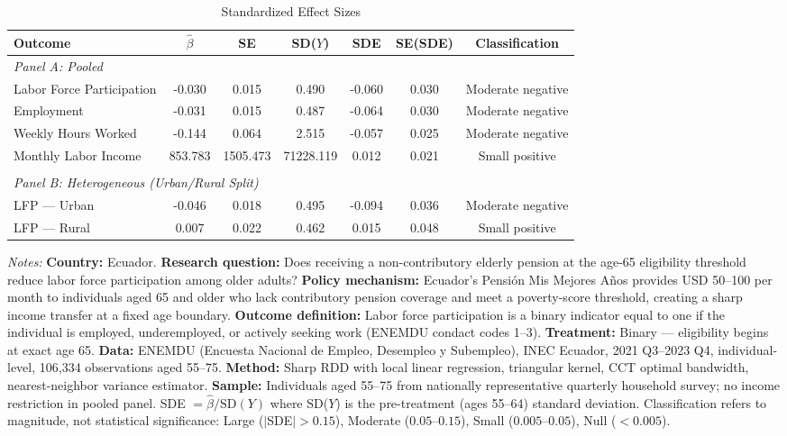 \begin{table}[t]
\centering
\begin{threeparttable}
\caption{Standardized Effect Sizes}
\label{tab:sde}
\begin{adjustbox}{max width=\textwidth}
\begin{tabular}{lcccccc}
\hline\hline
  Outcome & $\hat{\beta}$ & SE & SD($Y$) & SDE & SE(SDE) & Classification \\
\hline
  \multicolumn{7}{l}{\textit{Panel A: Pooled}} \\
  Labor Force Participation & -0.030 & 0.015 & 0.490 & -0.060 & 0.030 & Moderate negative \\
  Employment & -0.031 & 0.015 & 0.487 & -0.064 & 0.030 & Moderate negative \\
  Weekly Hours Worked & -0.144 & 0.064 & 2.515 & -0.057 & 0.025 & Moderate negative \\
  Monthly Labor Income & 853.783 & 1505.473 & 71228.119 & 0.012 & 0.021 & Small positive \\
  \\
  \multicolumn{7}{l}{\textit{Panel B: Heterogeneous (Urban/Rural Split)}} \\
  LFP --- Urban & -0.046 & 0.018 & 0.495 & -0.094 & 0.036 & Moderate negative \\
  LFP --- Rural & 0.007 & 0.022 & 0.462 & 0.015 & 0.048 & Small positive \\
\hline\hline
\end{tabular}
\end{adjustbox}
\begin{tablenotes}\footnotesize
\item \textit{Notes:} \textbf{Country:} Ecuador. \textbf{Research question:} Does receiving a non-contributory elderly pension at the age-65 eligibility threshold reduce labor force participation among older adults? \textbf{Policy mechanism:} Ecuador's Pensi{\'o}n Mis Mejores A{\~n}os provides USD 50--100 per month to individuals aged 65 and older who lack contributory pension coverage and meet a poverty-score threshold, creating a sharp income transfer at a fixed age boundary. \textbf{Outcome definition:} Labor force participation is a binary indicator equal to one if the individual is employed, underemployed, or actively seeking work (ENEMDU condact codes 1--3). \textbf{Treatment:} Binary --- eligibility begins at exact age 65. \textbf{Data:} ENEMDU (Encuesta Nacional de Empleo, Desempleo y Subempleo), INEC Ecuador, 2021 Q3--2023 Q4, individual-level, 106,334 observations aged 55--75. \textbf{Method:} Sharp RDD with local linear regression, triangular kernel, CCT optimal bandwidth, nearest-neighbor variance estimator. \textbf{Sample:} Individuals aged 55--75 from nationally representative quarterly household survey; no income restriction in pooled panel. SDE $= \hat{\beta} / \text{SD}(Y)$ where SD($Y$) is the pre-treatment (ages 55--64) standard deviation. Classification refers to magnitude, not statistical significance: Large ($|$SDE$| > 0.15$), Moderate ($0.05$--$0.15$), Small ($0.005$--$0.05$), Null ($< 0.005$).
\end{tablenotes}
\end{threeparttable}
\end{table}
